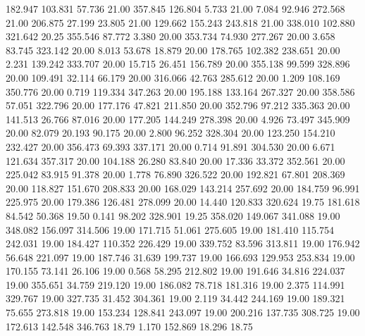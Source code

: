  182.947  103.831   57.736        21.00
 357.845  126.804    5.733        21.00
   7.084   92.946  272.568        21.00
 206.875   27.199   23.805        21.00
 129.662  155.243  243.818        21.00
 338.010  102.880  321.642        20.25
 355.546   87.772    3.380        20.00
 353.734   74.930  277.267        20.00
   3.658   83.745  323.142        20.00
   8.013   53.678   18.879        20.00
 178.765  102.382  238.651        20.00
   2.231  139.242  333.707        20.00
  15.715   26.451  156.789        20.00
 355.138   99.599  328.896        20.00
 109.491   32.114   66.179        20.00
 316.066   42.763  285.612        20.00
   1.209  108.169  350.776        20.00
   0.719  119.334  347.263        20.00
 195.188  133.164  267.327        20.00
 358.586   57.051  322.796        20.00
 177.176   47.821  211.850        20.00
 352.796   97.212  335.363        20.00
 141.513   26.766   87.016        20.00
 177.205  144.249  278.398        20.00
   4.926   73.497  345.909        20.00
  82.079   20.193   90.175        20.00
   2.800   96.252  328.304        20.00
 123.250  154.210  232.427        20.00
 356.473   69.393  337.171        20.00
   0.714   91.891  304.530        20.00
   6.671  121.634  357.317        20.00
 104.188   26.280   83.840        20.00
  17.336   33.372  352.561        20.00
 225.042   83.915   91.378        20.00
   1.778   76.890  326.522        20.00
 192.821   67.801  208.369        20.00
 118.827  151.670  208.833        20.00
 168.029  143.214  257.692        20.00
 184.759   96.991  225.975        20.00
 179.386  126.481  278.099        20.00
  14.440  120.833  320.624        19.75
 181.618   84.542   50.368        19.50
   0.141   98.202  328.901        19.25
 358.020  149.067  341.088        19.00
 348.082  156.097  314.506        19.00
 171.715   51.061  275.605        19.00
 181.410  115.754  242.031        19.00
 184.427  110.352  226.429        19.00
 339.752   83.596  313.811        19.00
 176.942   56.648  221.097        19.00
 187.746   31.639  199.737        19.00
 166.693  129.953  253.834        19.00
 170.155   73.141   26.106        19.00
   0.568   58.295  212.802        19.00
 191.646   34.816  224.037        19.00
 355.651   34.759  219.120        19.00
 186.082   78.718  181.316        19.00
   2.375  114.991  329.767        19.00
 327.735   31.452  304.361        19.00
   2.119   34.442  244.169        19.00
 189.321   75.655  273.818        19.00
 153.234  128.841  243.097        19.00
 200.216  137.735  308.725        19.00
 172.613  142.548  346.763        18.79
   1.170  152.869   18.296        18.75
